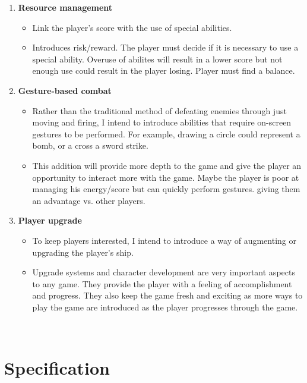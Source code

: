 \documentclass[a4paper]{scrreprt}
\begin{document}
\begin{enumerate}
  \item \textbf{Resource management}
  \begin{itemize}
    \item Link the player's score with the use of special abilities.
    \item Introduces risk/reward. The player must decide if it is necessary to use a special ability. Overuse of abilites will result in a lower score but not enough use could result in the player losing. Player must find a balance.
  \end{itemize}
  \item \textbf{Gesture-based combat}
  \begin{itemize}
    \item Rather than the traditional method of defeating enemies through just moving and firing, I intend to introduce abilities that require on-screen gestures to be performed. For example, drawing a circle could represent a bomb, or a cross a sword strike.
    \item This addition will provide more depth to the game and give the player an opportunity to interact more with the game. Maybe the player is poor at managing his energy/score but can quickly perform gestures. giving them an advantage vs. other players.
  \end{itemize}
  \item \textbf{Player upgrade}
  \begin{itemize}
    \item To keep players interested, I intend to introduce a way of augmenting or upgrading the player's ship.
    \item Upgrade systems and character development are very important aspects to any game. They provide the player with a feeling of accomplishment and progress. They also keep the game fresh and exciting as more ways to play the game are introduced as the player progresses through the game.
  \end{itemize}

\end{enumerate}


\

\chapter{Specification}
\end{document}

